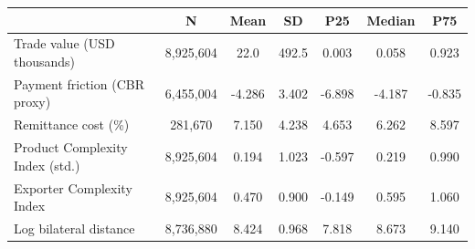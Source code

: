 \begin{tabular}{lcccccc}
\toprule
 & N & Mean & SD & P25 & Median & P75 \\
\midrule
Trade value (USD thousands) & 8,925,604 & 22.0 & 492.5 & 0.003 & 0.058 & 0.923 \\
Payment friction (CBR proxy) & 6,455,004 & -4.286 & 3.402 & -6.898 & -4.187 & -0.835 \\
Remittance cost (\%) & 281,670 & 7.150 & 4.238 & 4.653 & 6.262 & 8.597 \\
Product Complexity Index (std.) & 8,925,604 & 0.194 & 1.023 & -0.597 & 0.219 & 0.990 \\
Exporter Complexity Index & 8,925,604 & 0.470 & 0.900 & -0.149 & 0.595 & 1.060 \\
Log bilateral distance & 8,736,880 & 8.424 & 0.968 & 7.818 & 8.673 & 9.140 \\
\bottomrule
\end{tabular}